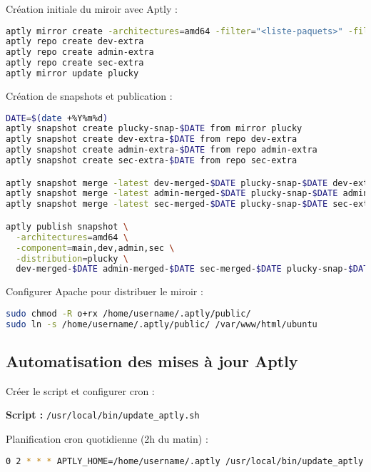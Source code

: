 \documentclass[a4paper,12pt]{article}
\begin{document}
Création initiale du miroir avec Aptly :

\begin{lstlisting}[language=bash]
aptly mirror create -architectures=amd64 -filter="<liste-paquets>" -filter-with-deps plucky http://archive.ubuntu.com/ubuntu plucky
aptly repo create dev-extra
aptly repo create admin-extra
aptly repo create sec-extra
aptly mirror update plucky
\end{lstlisting}

Création de snapshots et publication :

\begin{lstlisting}[language=bash]
DATE=$(date +%Y%m%d)
aptly snapshot create plucky-snap-$DATE from mirror plucky
aptly snapshot create dev-extra-$DATE from repo dev-extra
aptly snapshot create admin-extra-$DATE from repo admin-extra
aptly snapshot create sec-extra-$DATE from repo sec-extra

aptly snapshot merge -latest dev-merged-$DATE plucky-snap-$DATE dev-extra-$DATE
aptly snapshot merge -latest admin-merged-$DATE plucky-snap-$DATE admin-extra-$DATE
aptly snapshot merge -latest sec-merged-$DATE plucky-snap-$DATE sec-extra-$DATE

aptly publish snapshot \
  -architectures=amd64 \
  -component=main,dev,admin,sec \
  -distribution=plucky \
  dev-merged-$DATE admin-merged-$DATE sec-merged-$DATE plucky-snap-$DATE
\end{lstlisting}

Configurer Apache pour distribuer le miroir :

\begin{lstlisting}[language=bash]
sudo chmod -R o+rx /home/username/.aptly/public/
sudo ln -s /home/username/.aptly/public/ /var/www/html/ubuntu
\end{lstlisting}

\subsection{Automatisation des mises à jour Aptly}

Créer le script et configurer cron :

\textbf{Script :} \texttt{/usr/local/bin/update\_aptly.sh}

Planification cron quotidienne (2h du matin) :

\begin{lstlisting}[language=bash]
0 2 * * * APTLY_HOME=/home/username/.aptly /usr/local/bin/update_aptly.sh >> /var/log/aptly-update.log 2>&1
\end{lstlisting}
\end{document}
